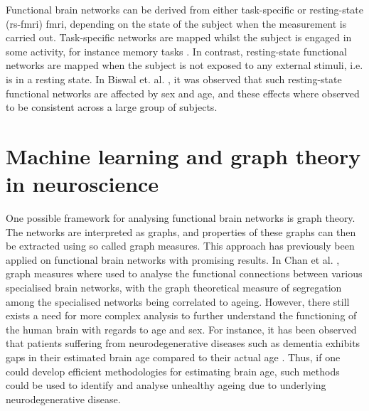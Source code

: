 Functional brain networks can be derived from either task-specific or resting-state (\acrshort{rs-fmri}) \acrshort{fmri}, depending on the state of the subject when the measurement is carried out. Task-specific networks are mapped whilst the subject is engaged in some activity, for instance memory tasks \cite{grady}. In contrast, resting-state functional networks are mapped when the subject is not exposed to any external stimuli, i.e. is in a resting state. In Biswal et. al. \cite{biswal}, it was observed that such resting-state functional networks are affected by sex and age, and these effects where observed to be consistent across a large group of subjects.

\section{Machine learning and graph theory in neuroscience}

One possible framework for analysing functional brain networks is graph theory. The networks are interpreted as graphs, and properties of these graphs can then be extracted using so called graph measures. This approach has previously been applied on functional brain networks with promising results. In Chan et al. \cite{chan}, graph measures where used to analyse the functional connections between various specialised brain networks, with the graph theoretical measure of segregation among the specialised networks being correlated to ageing. However, there still exists a need for more complex analysis to further understand the functioning of the human brain with regards to age and sex. For instance, it has been observed that patients suffering from neurodegenerative diseases such as dementia exhibits gaps in their estimated brain age compared to their actual age \cite{kaufmann}. Thus, if one could develop efficient methodologies for estimating brain age, such methods could be used to identify and analyse unhealthy ageing due to underlying neurodegenerative disease. 

